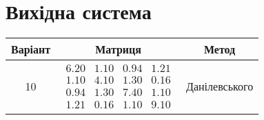 \documentclass{article}
\begin{document}
    \section{Вихідна система}
    \begin{tabular}{ |c|c|c| }
        \hline
        Варіант & Матриця & Метод \\ 
        \hline
        10
        &
        $\begin{matrix}
            6.20 & 1.10 & 0.94 & 1.21\\
            1.10 & 4.10 & 1.30 & 0.16\\
            0.94 & 1.30 & 7.40 & 1.10\\
            1.21 & 0.16 & 1.10 & 9.10
        \end{matrix}$
        &
        Данілевського
        \\ 
        \hline
    \end{tabular}

\end{document}
